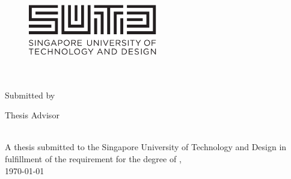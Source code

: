 \documentclass[
11pt, %
english, %
singlespacing, %
headsepline, %
]{MastersDoctoralThesis} %
\author{Jon Kartago \textsc{Lamida}} %
\begin{document}
\frontmatter %

\pagestyle{plain} %


\begin{titlepage}
\begin{center}

\begin{figure}
\centering
\includegraphics[width=0.5\textwidth]{Figures/SUTD}
\end{figure}

 \hfill\break\\[2.3cm]
 
{\huge \bfseries \ttitle}\\[3cm] %


Submitted by\\[1cm]
\authorname %

\vspace{4em}

Thesis Advisor\\[1cm]
\supname %
 
\vspace{4em} 

\pillarname\\[1.5cm] %
 
\large{A thesis submitted to the Singapore University of Technology and Design in fulfillment of the requirement for the degree of \degreename, \pillarname}\\[1cm] %

 
{\large \today}\\[4cm] %
 
\vfill
\end{center}
\end{titlepage}
\end{document}
